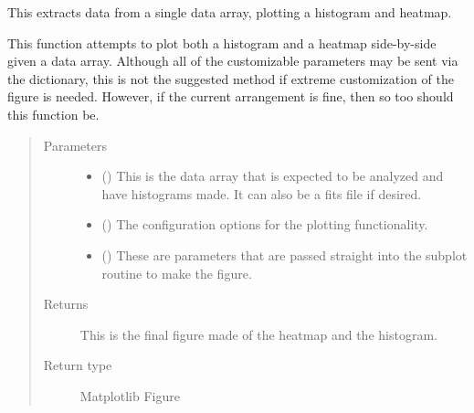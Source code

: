 \documentclass[letterpaper,10pt,english]{sphinxmanual}
\begin{document}
\begin{fulllineitems}
\label{\detokenize{python_docstrings/IfA_Smeargle.oscar.multi_figure:IfA_Smeargle.oscar.multi_figure.plot_single_heatmap_and_histogram}}
This extracts data from a single data array, plotting a histogram
and heatmap.

This function attempts to plot both a histogram and a heatmap
side-by-side given a data array. Although all of the customizable
parameters may be sent via the dictionary, this is not the suggested
method if extreme customization of the figure is needed. However, if the
current arrangement is fine, then so too should this function be.
\begin{quote}\begin{description}
\item[{Parameters}] \leavevmode\begin{itemize}
\item {} 
 () \textendash{} This is the data array that is expected to be analyzed and have
histograms made. It can also be a fits file if desired.

\item {} 
 ({\hyperref[\detokenize{python_docstrings/IfA_Smeargle.yankee.yankee_main:IfA_Smeargle.yankee.yankee_main.SmeargleConfig}]{}}) \textendash{} The configuration options for the plotting functionality.

\item {} 
 () \textendash{} These are parameters that are passed straight into the subplot
routine to make the figure.

\end{itemize}

\item[{Returns}] \leavevmode
{} \textendash{} This is the final figure made of the heatmap and the histogram.

\item[{Return type}] \leavevmode
Matplotlib Figure

\end{description}\end{quote}

\end{fulllineitems}
\end{document}
